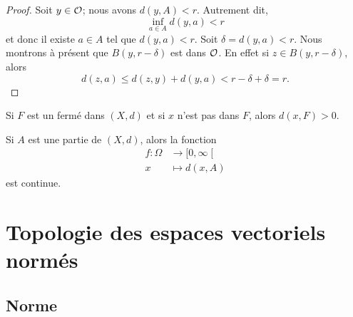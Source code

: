 \begin{proof}
   Soit \( y\in \mathcal{O}\); nous avons \( d(y,A)<r\). Autrement dit,
   \begin{equation}
       \inf_{a\in A}d(y,a)<r
   \end{equation}
   et donc il existe \( a\in A\) tel que \( d(y,a)<r\). Soit \( \delta=d(y,a)<r\). Nous montrons à présent que \( B(y,r-\delta)\) est dans \( \mathcal{O}\). En effet si \( z\in B(y,r-\delta)\), alors
   \begin{equation}
       d(z,a)\leq d(z,y)+d(y,a)<r-\delta+\delta=r.
   \end{equation}
\end{proof}

\begin{lemma}        \label{LEMooEQIZooLpsbOe}
    Si \( F\) est un fermé dans \( (X,d)\) et si \( x\) n'est pas dans \( F\), alors \( d(x,F)>0\).
\end{lemma}

\begin{lemma}        \label{LEMooCFGTooIfdcfk}
    Si \( A\) est une partie de \( (X,d)\), alors la fonction
    \begin{equation}
        \begin{aligned}
            f\colon \Omega&\to \mathopen[ 0 , \infty \mathclose[ \\
            x&\mapsto d(x,A) 
        \end{aligned}
    \end{equation}
    est continue.
\end{lemma}

\section{Topologie des espaces vectoriels normés}
\subsection{Norme}

